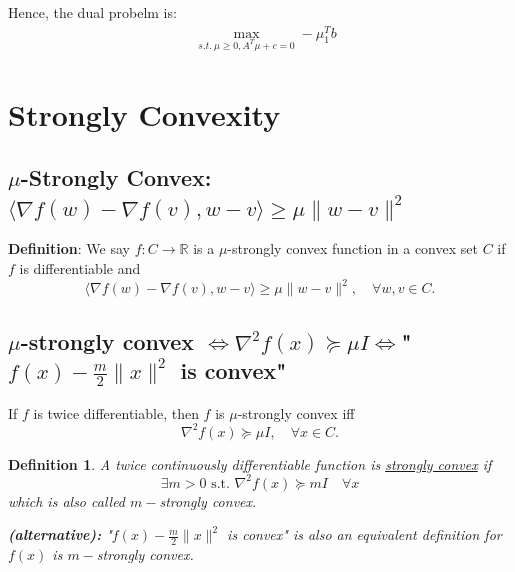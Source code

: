 \documentclass[11pt,a4paper]{article}
\newtheorem{definition}{Definition}
\begin{document}
Hence, the dual probelm is:
\begin{equation}
    \begin{aligned}
        &\max_{s.t.\ \mu\geq 0, A^T\mu+c=0}-\mu_1^Tb
    \end{aligned}
    \nonumber
\end{equation}
\begin{center}
\end{center}










\section{Strongly Convexity}
\subsection{$\mu$-Strongly Convex: $
\langle\nabla f(w)-\nabla f(v), w-v\rangle \geq \mu\|w-v\|^{2}$}
\textbf{Definition}: We say $f: C \rightarrow \mathbb{R}$ is a $\mu$-strongly convex function in a convex set $C$ if $f$ is differentiable and
$$
\langle\nabla f(w)-\nabla f(v), w-v\rangle \geq \mu\|w-v\|^{2}, \quad \forall w, v \in C .
$$
\subsection{$\mu$-strongly convex $\Leftrightarrow \nabla^{2} f(x) \succeq \mu I\Leftrightarrow$"$f(x)-\frac{m}{2}\|x\|^2$ is convex"}
If $f$ is twice differentiable, then $f$ is $\mu$-strongly convex iff
$$
\nabla^{2} f(x) \succeq \mu I, \quad \forall x \in C .
$$
\begin{definition}
    A twice continuously differentiable function is \underline{strongly convex} if $$\exists m>0\text{ s.t. }\nabla^2 f(x)\succeq mI\quad \forall x$$
    which is also called $m-$strongly convex.

    \textbf{(alternative):} "$f(x)-\frac{m}{2}\|x\|^2$ is convex" is also an equivalent definition for $f(x)$ is $m-$strongly convex.
\end{definition}
\end{document}
